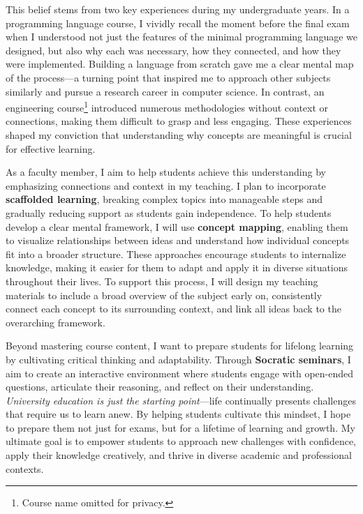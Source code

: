 \documentclass{article}
\begin{document}

This belief stems from two key experiences during my undergraduate years. In a programming language course, I vividly recall the moment before the final exam when I understood not just the features of the minimal programming language we designed, but also why each was necessary, how they connected, and how they were implemented. Building a language from scratch gave me a clear mental map of the process—a turning point that inspired me to approach other subjects similarly and pursue a research career in computer science. In contrast, an engineering course\footnote{Course name omitted for privacy.} introduced numerous methodologies without context or connections, making them difficult to grasp and less engaging. These experiences shaped my conviction that understanding why concepts are meaningful is crucial for effective learning.

As a faculty member, I aim to help students achieve this understanding by emphasizing connections and context in my teaching. I plan to incorporate \textbf{scaffolded learning}, breaking complex topics into manageable steps and gradually reducing support as students gain independence. To help students develop a clear mental framework, I will use \textbf{concept mapping}, enabling them to visualize relationships between ideas and understand how individual concepts fit into a broader structure. These approaches encourage students to internalize knowledge, making it easier for them to adapt and apply it in diverse situations throughout their lives. To support this process, I will design my teaching materials to include a broad overview of the subject early on, consistently connect each concept to its surrounding context, and link all ideas back to the overarching framework.

Beyond mastering course content, I want to prepare students for lifelong learning by cultivating critical thinking and adaptability. Through \textbf{Socratic seminars}, I aim to create an interactive environment where students engage with open-ended questions, articulate their reasoning, and reflect on their understanding. \emph{University education is just the starting point}—life continually presents challenges that require us to learn anew. By helping students cultivate this mindset, I hope to prepare them not just for exams, but for a lifetime of learning and growth. My ultimate goal is to empower students to approach new challenges with confidence, apply their knowledge creatively, and thrive in diverse academic and professional contexts.
\end{document}

